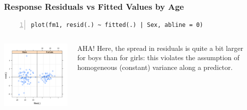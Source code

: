 \documentclass{beamer}
\begin{document}
\begin{frame}[fragile]
    \frametitle{Response Residuals vs Fitted Values by Age}
    \scriptsize\begin{Verbatim}[numbers=left,numbersep=6pt,frame=single]
plot(fm1, resid(.) ~ fitted(.) | Sex, abline = 0)
    \end{Verbatim}
    \begin{columns}
        \begin{column}{0.5\textwidth}
            \includegraphics[width=\textwidth]{lectures/day_7_diagnostics_of_mems/figures/unnamed-chunk-29-1.png}
        \end{column}
        \begin{column}{0.5\textwidth}
        \normalsize
            AHA! Here, the spread in residuals is quite a bit larger for boys than for girls: this violates the assumption of homogeneous (constant) variance along a predictor.
        \end{column}
    \end{columns}
\end{frame}
\end{document}
